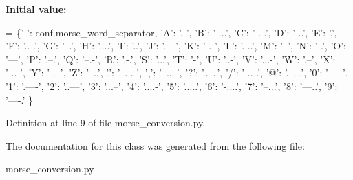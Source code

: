 {\bfseries Initial value\+:}
\begin{DoxyCode}
=  \{\textcolor{stringliteral}{' '}: conf.morse\_word\_separator,
             \textcolor{stringliteral}{'A'}: \textcolor{stringliteral}{'.-'}, \textcolor{stringliteral}{'B'}: \textcolor{stringliteral}{'-...'}, \textcolor{stringliteral}{'C'}: \textcolor{stringliteral}{'-.-.'}, \textcolor{stringliteral}{'D'}: \textcolor{stringliteral}{'-..'}, \textcolor{stringliteral}{'E'}: \textcolor{stringliteral}{'.'}, \textcolor{stringliteral}{'F'}: \textcolor{stringliteral}{'..-.'},
             \textcolor{stringliteral}{'G'}: \textcolor{stringliteral}{'--.'}, \textcolor{stringliteral}{'H'}: \textcolor{stringliteral}{'....'}, \textcolor{stringliteral}{'I'}: \textcolor{stringliteral}{'..'}, \textcolor{stringliteral}{'J'}: \textcolor{stringliteral}{'.---'}, \textcolor{stringliteral}{'K'}: \textcolor{stringliteral}{'-.-'}, \textcolor{stringliteral}{'L'}: \textcolor{stringliteral}{'.-..'},
             \textcolor{stringliteral}{'M'}: \textcolor{stringliteral}{'--'}, \textcolor{stringliteral}{'N'}: \textcolor{stringliteral}{'-.'}, \textcolor{stringliteral}{'O'}: \textcolor{stringliteral}{'---'}, \textcolor{stringliteral}{'P'}: \textcolor{stringliteral}{'.--.'}, \textcolor{stringliteral}{'Q'}: \textcolor{stringliteral}{'--.-'}, \textcolor{stringliteral}{'R': '}.-.',
             \textcolor{stringliteral}{'S'}: \textcolor{stringliteral}{'...'}, \textcolor{stringliteral}{'T'}: \textcolor{stringliteral}{'-'}, \textcolor{stringliteral}{'U': '}..-', 'V': '...-', 'W': '.--', 'X': '-..-',
             \textcolor{stringliteral}{'Y'}: \textcolor{stringliteral}{'-.--'}, \textcolor{stringliteral}{'Z'}: \textcolor{stringliteral}{'--..'}, \textcolor{stringliteral}{'.'}: \textcolor{stringliteral}{'.-.-.-'}, \textcolor{stringliteral}{','}: \textcolor{stringliteral}{'--..--'}, \textcolor{stringliteral}{'?'}: \textcolor{stringliteral}{'..--..'},
             \textcolor{stringliteral}{'/'}: \textcolor{stringliteral}{'-..-.'}, \textcolor{stringliteral}{'@'}: \textcolor{stringliteral}{'.--.-.'},
             \textcolor{stringliteral}{'0'}: \textcolor{stringliteral}{'-----'}, \textcolor{stringliteral}{'1'}: \textcolor{stringliteral}{'.----'}, \textcolor{stringliteral}{'2'}: \textcolor{stringliteral}{'..---'}, \textcolor{stringliteral}{'3'}: \textcolor{stringliteral}{'...--'}, \textcolor{stringliteral}{'4'}: \textcolor{stringliteral}{'....-'},
             \textcolor{stringliteral}{'5'}: \textcolor{stringliteral}{'.....'}, \textcolor{stringliteral}{'6'}: \textcolor{stringliteral}{'-....'}, \textcolor{stringliteral}{'7'}: \textcolor{stringliteral}{'--...'}, \textcolor{stringliteral}{'8'}: \textcolor{stringliteral}{'---..'}, \textcolor{stringliteral}{'9'}: \textcolor{stringliteral}{'----.'}
             \}
\end{DoxyCode}


Definition at line 9 of file morse\+\_\+conversion.\+py.



The documentation for this class was generated from the following file\+:\begin{DoxyCompactItemize}
\item 
morse\+\_\+conversion.\+py\end{DoxyCompactItemize}
